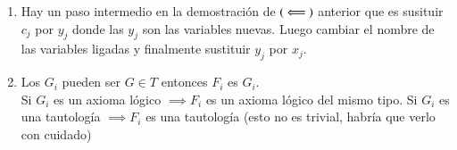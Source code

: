 \begin{obs}$ $
    \begin{enumerate}
        \item Hay un paso intermedio en la demostración de $(\ \Longleftarrow\ )$ anterior que es susituir $c_j$ por $y_j$ donde las $y_j$ son las variables nuevas. Luego cambiar el nombre de las variables ligadas y finalmente sustituir $y_j$ por $x_j$.
        \item Los $G_i$ pueden ser $G\in T$ entonces $F_i$ es $G_i$.\\
        Si $G_i$ es un axioma lógico $\implies F_i$ es un axioma lógico del mismo tipo. Si $G_i$ es una tautología $\implies F_i$ es una tautología (esto no es trivial, habría que verlo con cuidado)
    \end{enumerate}
\end{obs}
